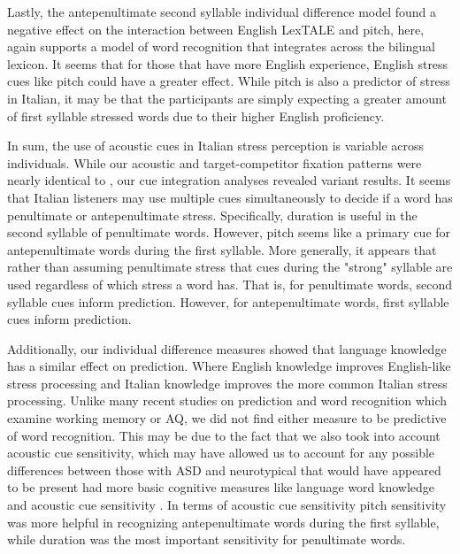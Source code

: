 Lastly, the antepenultimate second syllable individual difference model found a negative effect on the interaction between English LexTALE and pitch, here, again supports a model of word recognition that integrates across the bilingual lexicon. It seems that for those that have more English experience, English stress cues like pitch could have a greater effect. While pitch is also a predictor of stress in Italian, it may be that the participants are simply expecting a greater amount of first syllable stressed words due to their higher English proficiency.

In sum, the use of acoustic cues in Italian stress perception is variable across individuals. While our acoustic and target-competitor fixation patterns were nearly identical to \cite{Sulpizio_McQueen_2012}, our cue integration analyses revealed variant results. It seems that Italian listeners may use multiple cues simultaneously to decide if a word has penultimate or antepenultimate stress. Specifically, duration is useful in the second syllable of penultimate words. However, pitch seems like a primary cue for antepenultimate words during the first syllable. More generally, it appears that rather than assuming penultimate stress that cues during the "strong" syllable are used regardless of which stress a word has. That is, for penultimate words, second syllable cues inform prediction. However, for antepenultimate words, first syllable cues inform prediction. 

Additionally, our individual difference measures showed that language knowledge has a similar effect on prediction. Where English knowledge improves English-like stress processing and Italian knowledge improves the more common Italian stress processing. Unlike many recent studies on prediction and word recognition which examine working memory or AQ, we did not find either measure to be predictive of word recognition. This may be due to the fact that we also took into account acoustic cue sensitivity, which may have allowed us to account for any possible differences between those with ASD and neurotypical that would have appeared to be present had more basic cognitive measures like language word knowledge and acoustic cue sensitivity \cite{grossman2023}. In terms of acoustic cue sensitivity pitch sensitivity was more helpful in recognizing antepenultimate words during the first syllable, while duration was the most important sensitivity for penultimate words.

